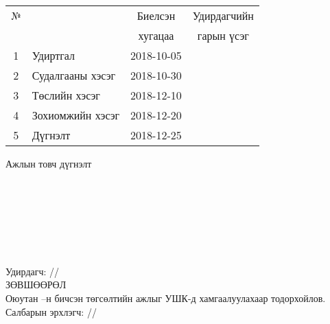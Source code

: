 \begin{titlepage}
\begin{center}
\begin{tabular}{|c|p{7cm}|c|c|}
	\hline
	№ & \makebox[7cm][c]{Хийж гүйцэтгэсэн ажил} & Биелсэн     & Удирдагчийн \\
	  &                    & хугацаа    & гарын үсэг \\ \hline
	1 & {Удиртгал}         & 2018-10-05 &  \\ \hline
	2 & {Судалгааны хэсэг} & 2018-10-30 &  \\ \hline
	3 & {Төслийн хэсэг}    & 2018-12-10 &  \\ \hline
	4 & {Зохиомжийн хэсэг} & 2018-12-20 &  \\ \hline
	5 & {Дүгнэлт}          & 2018-12-25 &  \\ \hline
\end{tabular}

\vspace{1cm}
Ажлын товч дүгнэлт \\[0.5cm]
\dotfill \\[0.2cm]
\dotfill \\[0.2cm]
\dotfill \\[0.2cm]
\dotfill \\[0.2cm]
\dotfill \\[0.2cm]
\dotfill \\[0.2cm]
\dotfill \\[0.5cm]
Удирдагч: \makebox[3cm]{\dotfill} /\supname/ \\

\vspace{2cm}
ЗӨВШӨӨРӨЛ \\[0.5cm]
Оюутан \shortname --н бичсэн төгсөлтийн ажлыг УШК-д хамгаалуулахаар тодорхойлов.\\[0.5cm]
Салбарын эрхлэгч: \makebox[3cm]{\dotfill} /\chairname/
\end{center}

\end{titlepage}

\newpage

